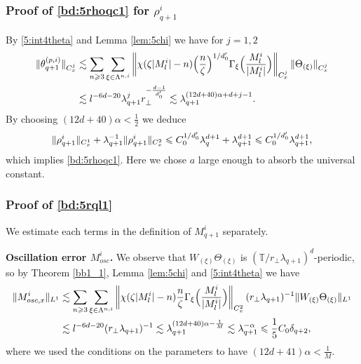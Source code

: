 \documentclass[UTF-8,reqno]{amsart}
\numberwithin{equation}{section}
\theoremstyle{definition}
\def\({{\Big(}}
\def\){{\Big)}}
\newcommand{\norm}[1]{\left\|#1\right\|}
\def\geq{\geqslant}
\def\leq{\leqslant}
\def\({{\Big(}}
\def\){{\Big)}}
\def\geq{\geqslant}
\def\leq{\leqslant}
\begin{document}
\subsubsection{Proof of  \eqref{bd:5rhoqc1} for $  \rho^i_{q+1}$}
  By \eqref{5:int4theta}  and Lemma \ref{lem:5chi} we have for $j=1,2$
\begin{align*}
\|\theta_{q+1}^{(p,i)} \|_ {C_{x}^j} 
&\lesssim\sum_{n\geq3}\sum_{\xi\in\Lambda^{n,i}}\norm{\chi(\zeta |M^i_l|-n)\(\frac{n}{\zeta }\)^{1/d_0'}\Gamma_{\xi}\(\frac{M^i_l}{|M^i_l|}\)}_ {C_{x}^j}\|\Theta_{ (\xi)} \|_ {C_{x}^j}\notag\\ 
&\lesssim l^{-6d-20}\lambda_{q+1}^j r_\perp^{-\frac{d-1}{d_0'}}\lesssim
\lambda_{q+1}^{(12d+40)\alpha+d+j-1}.\notag
\end{align*}
By choosing $(12d+40)\alpha<\frac{1}{2}$  we deduce 
\begin{align}
    \|  \rho^i_{q+1}\|_ {C_{x}^1}+\lambda_{q+1}^{-1}\|  \rho^i_{q+1}\|_ {C_{x}^2}%
    \leq C_0^{1/d_0'}\lambda_{q}^{ d+1}+  \lambda_{q+1}^{ d+1}\leq C_0^{1/d_0'} \lambda_{q+1}^{ d+1},\notag
\end{align}
which implies  \eqref{bd:5rhoqc1}. Here we chose $a$ large enough to absorb the universal constant.


\subsubsection{Proof of \eqref{bd:5rql1}}\label{sec:5estmq+1} We estimate each terms in the definition of $M^i_{q+1}$ separately. 

 
\textbf{Oscillation error $M^i_{osc}$.} 
We observe that $W_{ (\xi)}\Theta_{ (\xi)}$ is $(\mathbb{T}/r_\perp\lambda_{q+1})^d$-periodic, so by  Theorem \ref{bb1_1},  Lemma \ref{lem:5chi} and \eqref{5:int4theta}   we have
\begin{align}
\|M^i_{osc,x} \|_{L^1}
&\lesssim\sum_{n\geq3}\sum_{\xi\in\Lambda^{n,i}}\norm{\chi(\zeta |M^i_l|-n)\frac{n}{\zeta }\Gamma_{\xi}\(\frac{M^i_l}{|M^i_l|}\)}_{C_{x}^2}(r_\perp\lambda_{q+1})^{-1}\|W_{ (\xi)}\Theta_{ (\xi)}\|_{L^{1}}\notag\\
&\lesssim l^{-6d-20}(r_\perp\lambda_{q+1})^{-1}\lesssim \lambda_{q+1}^{(12d+40)\alpha-\frac{1}{M}}
\lesssim  \lambda_{q+1}^{-\alpha}\leq  \frac15C_0\delta_{q+2}, \notag
\end{align}
where we used the  conditions on the parameters to have $(12d+41)\alpha<\frac{1}{M}$.
\end{document}
